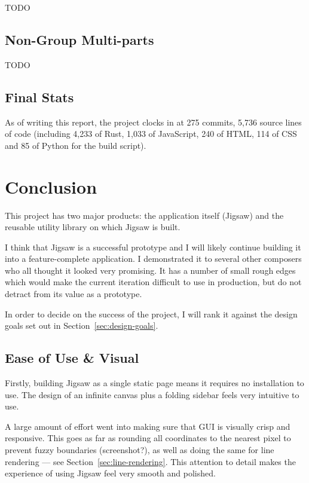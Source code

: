 \documentclass[12pt]{article}
\begin{document}
TODO

\subsection{Non-Group Multi-parts}

TODO

\subsection{Final Stats}

As of writing this report, the project clocks in at 275 commits, 5,736 source lines of code
(including 4,233 of Rust, 1,033 of JavaScript, 240 of HTML, 114 of CSS and 85 of Python for the
build script).



\pagebreak

\section{Conclusion}

This project has two major products: the application itself (Jigsaw) and the reusable utility
library on which Jigsaw is built.

I think that Jigsaw is a successful prototype and I will likely continue building it into a
feature-complete application.  I demonstrated it to several other composers who all thought it
looked very promising.  It has a number of small rough edges which would make the current iteration
difficult to use in production, but do not detract from its value as a prototype.

In order to decide on the success of the project, I will rank it against the design goals set out in
Section~\ref{sec:design-goals}.

\subsection{Ease of Use \& Visual}

Firstly, building Jigsaw as a single static page means it requires no installation to use.  The
design of an infinite canvas plus a folding sidebar feels very intuitive to use.

A large amount of effort went into making sure that GUI is visually crisp and responsive.  This
goes as far as rounding all coordinates to the nearest pixel to prevent fuzzy boundaries
(screenshot?), as well as doing the same for line rendering --- see
Section~\ref{sec:line-rendering}.  This attention to detail makes the experience of using Jigsaw
feel very smooth and polished.
\end{document}
